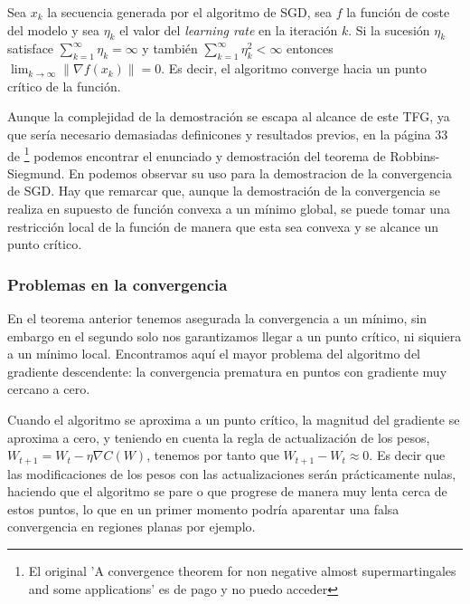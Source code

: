 \begin{proposicion}
    Sea ${x_k}$ la secuencia generada por el algoritmo de SGD, sea $f$ la función de coste del modelo y sea $\eta_k$ el valor del \textit{learning rate} en la iteración $k$. Si la sucesión ${\eta_k}$ satisface $\sum_{k=1}^\infty \eta_k = \infty$ y también $\sum_{k=1}^\infty \eta_k ^2 < \infty$  entonces $\lim_{k\rightarrow\infty} \| \nabla f(x_k) \| =0$. Es decir, el algoritmo converge hacia un punto crítico de la función.%
\end{proposicion}

Aunque la complejidad de la demostración se escapa al alcance de este TFG, ya que sería necesario demasiadas definicones y resultados previos, en la página 33 de \cite{RobbinSiegmund} \footnote{El original 'A convergence theorem for non negative almost supermartingales and some applications' es de pago y no puedo acceder} podemos encontrar el enunciado y demostración del teorema de Robbins-Siegmund. En \cite{RobbinSiegmundtoSGD} podemos observar su uso para la demostracion de la convergencia de SGD. Hay que remarcar que, aunque la demostración de la convergencia se realiza en supuesto de función convexa a un mínimo global, se puede tomar una restricción local de la función de manera que esta sea convexa y se alcance un punto crítico.






\subsubsection{Problemas en la convergencia}


En el teorema anterior tenemos asegurada la convergencia a un mínimo, sin embargo en el segundo solo nos garantizamos llegar a un punto crítico, ni siquiera a un mínimo local. Encontramos aquí el mayor problema del algoritmo del gradiente descendente: la convergencia prematura en puntos con gradiente muy cercano a cero. 

Cuando el algoritmo se aproxima a un punto crítico, la magnitud del gradiente se aproxima a cero, y teniendo en cuenta la regla de actualización de los pesos, $W_{t+1}=W_t - \eta \nabla C(W)$, tenemos por tanto que $W_{t+1} - W_t \approx 0$. Es decir que las modificaciones de los pesos con las actualizaciones serán prácticamente nulas, haciendo que el algoritmo se pare o que progrese de manera muy lenta cerca de estos puntos, lo que en un primer momento podría aparentar una falsa convergencia en regiones planas por ejemplo. 

